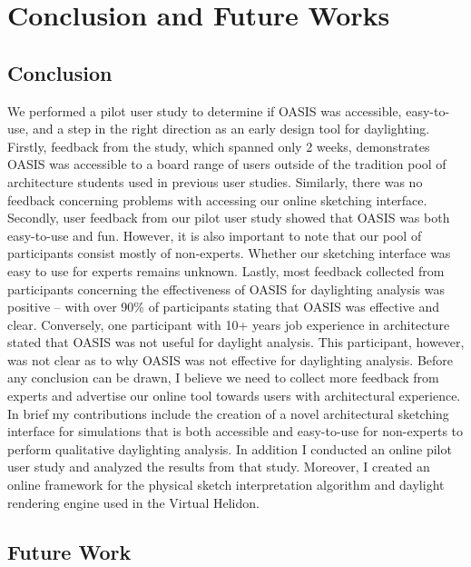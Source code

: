 \chapter{Conclusion and Future Works} \label{sec:results}

\section{Conclusion}
We performed a pilot user study to determine if OASIS was accessible, easy-to-use, and a step in the right direction as an early design tool for daylighting.
Firstly, feedback from the study, which spanned only 2 weeks, demonstrates OASIS was accessible to a board range of users outside of the tradition pool of architecture students used in previous user studies\cite{}.
Similarly, there was no feedback concerning problems with accessing our online sketching interface.
Secondly, user feedback from our pilot user study showed that OASIS was both easy-to-use and fun.
However, it is also important to note that our pool of participants consist mostly of non-experts. 
Whether our sketching interface was easy to use for experts remains unknown.
Lastly, most feedback collected from participants concerning the effectiveness of OASIS for daylighting analysis was positive -- with over 90\% of participants stating that OASIS was effective and clear.
Conversely, one participant with 10+ years job experience in architecture stated that OASIS was not useful for daylight analysis.
This participant, however, was not clear as to why OASIS was not effective for daylighting analysis.
Before any conclusion can be drawn, I believe we need to collect more feedback from experts and advertise our online tool towards users with architectural experience.
In brief my contributions include the creation of a novel architectural sketching interface for simulations that is both accessible and easy-to-use for non-experts to perform qualitative daylighting analysis.
In addition I conducted an online pilot user study and analyzed the results from that study.
Moreover, I created an online framework for the physical sketch interpretation algorithm and daylight rendering engine used in the Virtual Helidon.

\section{Future Work}

